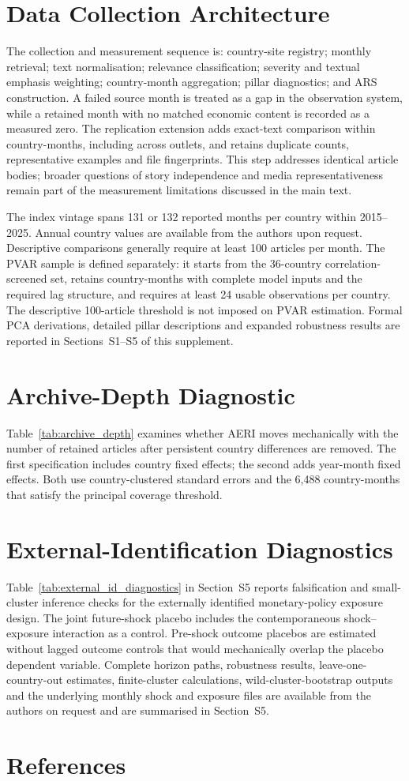 \documentclass[11pt]{article}
\begin{document}
\section{Data Collection Architecture}
The collection and measurement sequence is: country-site registry; monthly retrieval; text normalisation; relevance classification; severity and textual emphasis weighting; country-month aggregation; pillar diagnostics; and ARS construction. A failed source month is treated as a gap in the observation system, while a retained month with no matched economic content is recorded as a measured zero. The replication extension adds exact-text comparison within country-months, including across outlets, and retains duplicate counts, representative examples and file fingerprints. This step addresses identical article bodies; broader questions of story independence and media representativeness remain part of the measurement limitations discussed in the main text.

The index vintage spans 131 or 132 reported months per country within 2015--2025. Annual country values are available from the authors upon request. Descriptive comparisons generally require at least 100 articles per month. The PVAR sample is defined separately: it starts from the 36-country correlation-screened set, retains country-months with complete model inputs and the required lag structure, and requires at least 24 usable observations per country. The descriptive 100-article threshold is not imposed on PVAR estimation. Formal PCA derivations, detailed pillar descriptions and expanded robustness results are reported in Sections~S1--S5 of this supplement.

\section{Archive-Depth Diagnostic}
Table~\ref{tab:archive_depth} examines whether AERI moves mechanically with the number of retained articles after persistent country differences are removed. The first specification includes country fixed effects; the second adds year-month fixed effects. Both use country-clustered standard errors and the 6,488 country-months that satisfy the principal coverage threshold.


\section{External-Identification Diagnostics}
Table~\ref{tab:external_id_diagnostics} in Section~S5 reports falsification and small-cluster inference checks for the externally identified monetary-policy exposure design. The joint future-shock placebo includes the contemporaneous shock--exposure interaction as a control. Pre-shock outcome placebos are estimated without lagged outcome controls that would mechanically overlap the placebo dependent variable. Complete horizon paths, robustness results, leave-one-country-out estimates, finite-cluster calculations, wild-cluster-bootstrap outputs and the underlying monthly shock and exposure files are available from the authors on request and are summarised in Section~S5.

\clearpage
\section*{References}
\begingroup\small\singlespacing
\printbibliography[heading=none]
\endgroup
\end{document}
